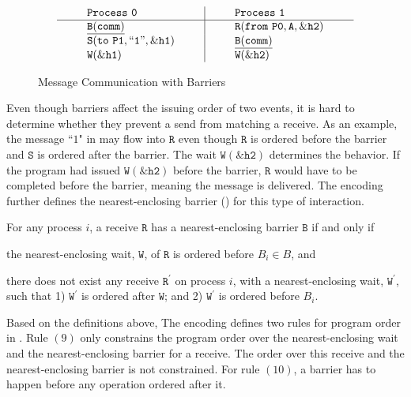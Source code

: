 \begin{figure}[h]
\[
\begin{array}{l|l}
\;\;\;\;\;\;\;\;\mathtt{Process\ 0}\;\;\;\;\;\;\;\; & \;\;\;\;\;\;\;\; \mathtt{Process\ 1}\;\;\;\;\;\;\;\; \\
\hline
\;\;\;\;\;\;\;\;\mathtt{\underline{B(comm)}}\;\;\;\;\;\;\;\; & \;\;\;\;\;\;\;\; \mathtt{R(from\ P0,A,\&h2)}\;\;\;\;\;\;\;\; \\
\;\;\;\;\;\;\;\;\mathtt{S(to\ P1,``1",\&h1)}\;\;\;\;\;\;\;\; & \;\;\;\;\;\;\;\; \mathtt{\underline{B(comm)}}\;\;\;\;\;\;\;\; \\
\;\;\;\;\;\;\;\;\mathtt{W(\&h1)}\;\;\;\;\;\;\;\; & \;\;\;\;\;\;\;\; \mathtt{W(\&h2)}\;\;\;\;\;\;\;\; \\
\end{array}
\]
\caption{Message Communication with Barriers} \label{fig:mc_barrier1}
\end{figure}

Even though barriers affect the issuing order of two events, it is hard to determine whether they prevent a send from matching a receive. As an example, the message ``$1$" in  may flow into $\mathtt{R}$ even though $\mathtt{R}$ is ordered before the barrier and $\mathtt{S}$ is ordered after the barrier. The wait $\mathtt{W(\&h2)}$ determines the behavior. If the program had issued $\mathtt{W(\&h2)}$ before the barrier, $\mathtt{R}$ would have to be completed before the barrier, meaning the message is delivered. The encoding further defines the nearest-enclosing barrier () for this type of interaction.

\begin{definition}\label{def:nb}
For any process $i$, a receive $\mathtt{R}$ has a nearest-enclosing barrier $\mathtt{B}$ if and only if
\begin{compactenum}
\item the nearest-enclosing wait, $\mathtt{W}$, of $\mathtt{R}$ is ordered before $B_i\in B$, and
\item there does not exist any receive $\mathtt{R^\prime}$ on process $i$, with a nearest-enclosing wait, $\mathtt{W^\prime}$, such that 1) $\mathtt{W^\prime}$ is ordered after $\mathtt{W}$; and 2) $\mathtt{W^\prime}$ is ordered before $B_i$.
\end{compactenum}
\end{definition}

Based on the definitions above, The encoding defines two rules for program order in . Rule $(9)$ only constrains the program order over the nearest-enclosing wait and the nearest-enclosing barrier for a receive. The order over this receive and the nearest-enclosing barrier is not constrained. For rule $(10)$, a barrier has to happen before any operation ordered after it. 

